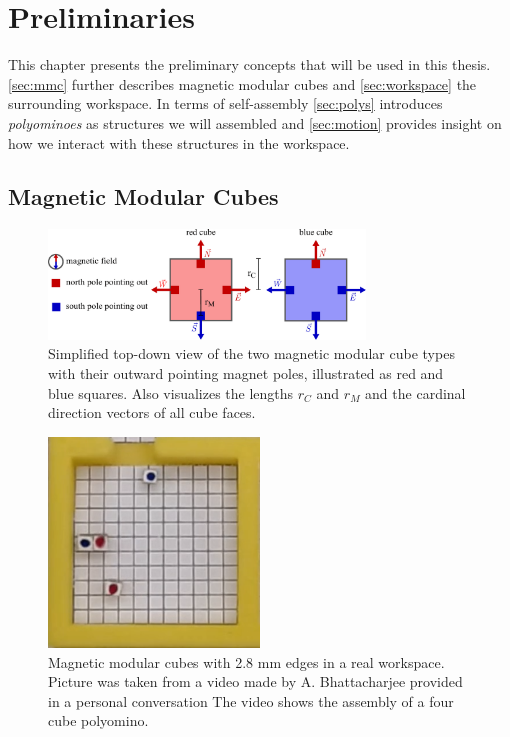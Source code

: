 \chapter{Preliminaries}
\label{chap:prelim}

This chapter presents the preliminary concepts that will be used in this thesis.
\autoref{sec:mmc} further describes magnetic modular cubes and \autoref{sec:workspace} the surrounding workspace.
In terms of self-assembly \autoref{sec:polys} introduces \textit{polyominoes} as structures we will assembled and \autoref{sec:motion} provides insight on how we interact with these structures in the workspace.

\section{Magnetic Modular Cubes}
\label{sec:mmc}

\begin{figure}
	\centering
	\includegraphics[width=0.75\textwidth]{figures/magnetic_cubes.pdf}
	\caption[Top-down view of the two magnetic modular cube types]{Simplified top-down view of the two magnetic modular cube types with their outward pointing magnet poles, illustrated as red and blue squares. Also visualizes the lengths $r_C$ and $r_M$ and the cardinal direction vectors of all cube faces.}
	\label{fig:magnetic_cubes}
\end{figure}

\begin{figure}
	\centering
	\includegraphics[width=0.5\textwidth]{figures/real_mmcs.png}
	\caption[Picture of magnetic modular cubes in real workspace]{Magnetic modular cubes with 2.8 mm edges in a real workspace. Picture was taken from a video made by A. Bhattacharjee provided in a personal conversation The video shows the assembly of a four cube polyomino.}
	\label{fig:real_mmcs}
\end{figure}


